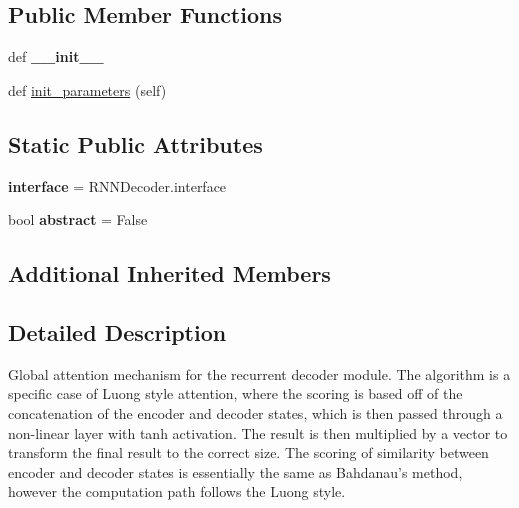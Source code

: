 \subsection*{Public Member Functions}
\begin{DoxyCompactItemize}
\item 
def {\bfseries \+\_\+\+\_\+init\+\_\+\+\_\+}\hypertarget{classrnn_1_1ConcatAttentionRNNDecoder_aeac71794a63879580d75c06622c54194}{}\label{classrnn_1_1ConcatAttentionRNNDecoder_aeac71794a63879580d75c06622c54194}

\item 
def \hyperlink{classrnn_1_1ConcatAttentionRNNDecoder_ac69bf078fd13962611eecf184ae8a6bc}{init\+\_\+parameters} (self)
\end{DoxyCompactItemize}
\subsection*{Static Public Attributes}
\begin{DoxyCompactItemize}
\item 
{\bfseries interface} = R\+N\+N\+Decoder.\+interface\hypertarget{classrnn_1_1ConcatAttentionRNNDecoder_adb33ad797040b58dcb38bf8bd62437d1}{}\label{classrnn_1_1ConcatAttentionRNNDecoder_adb33ad797040b58dcb38bf8bd62437d1}

\item 
bool {\bfseries abstract} = False\hypertarget{classrnn_1_1ConcatAttentionRNNDecoder_a02c21a92b263ee91427642efa4b63699}{}\label{classrnn_1_1ConcatAttentionRNNDecoder_a02c21a92b263ee91427642efa4b63699}

\end{DoxyCompactItemize}
\subsection*{Additional Inherited Members}


\subsection{Detailed Description}
\begin{DoxyVerb}Global attention mechanism for the recurrent decoder module. The algorithm is a specific case
of Luong style attention, where the scoring is based off of the concatenation of the encoder
and decoder states, which is then passed through a non-linear layer with tanh activation.
The result is then multiplied by a vector to transform the final result to the correct size.
The scoring of similarity between encoder and decoder states is essentially the same as Bahdanau's
method, however the computation path follows the Luong style.
\end{DoxyVerb}
 

